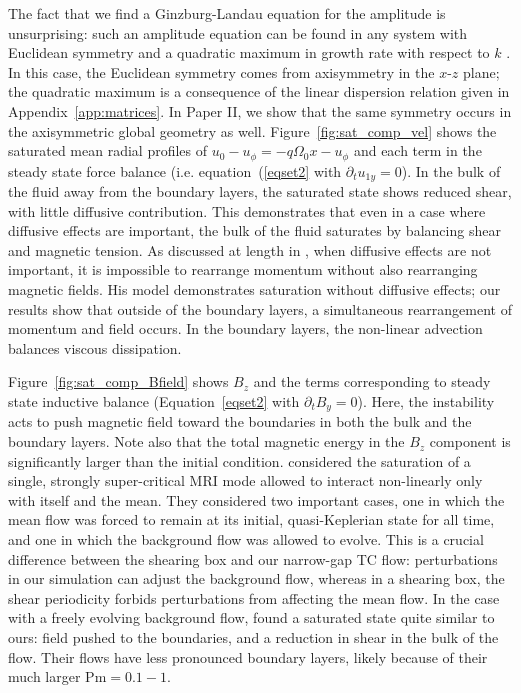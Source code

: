 \documentclass{emulateapj}
\newcommand{\Pm}{\mathrm{Pm}}
\begin{document}
The fact that we find a Ginzburg-Landau equation for the amplitude is unsurprising: such an amplitude equation can be found in any system with Euclidean symmetry and a quadratic maximum in growth rate with respect to $k$ \citep{Hoyle:2006}. In this case, the Euclidean symmetry comes from axisymmetry in the $x$-$z$ plane; the quadratic maximum is a consequence of the linear dispersion relation given in Appendix~\ref{app:matrices}.  In Paper II, we show that the same symmetry occurs in the axisymmetric global geometry as well. Figure~\ref{fig:sat_comp_vel} shows the saturated mean radial profiles of $u_0 - u_{\phi} = -q \Omega_0 x - u_{\phi}$ and each term in the steady state force balance (i.e. equation~(\ref{eqset2} with $\partial_t u_{1y} = 0$). In the bulk of the fluid away from the boundary layers, the saturated state shows reduced shear, with little diffusive contribution. This demonstrates that even in a case where diffusive effects are important, the bulk of the fluid saturates by balancing shear and magnetic tension. As discussed at length in \citet{Vasil:2015}, when diffusive effects are not important, it is impossible to rearrange momentum without also rearranging magnetic fields. His model demonstrates saturation without diffusive effects; our results show that outside of the boundary layers, a simultaneous rearrangement of momentum and field occurs. In the boundary layers, the non-linear advection balances viscous dissipation. 

Figure~\ref{fig:sat_comp_Bfield} shows $B_z$ and the terms corresponding to steady state inductive balance (Equation~\ref{eqset2} with $\partial_t B_{y} = 0$). Here, the instability acts to push magnetic field toward the boundaries in both the bulk and the boundary layers. Note also that the total magnetic energy in the $B_z$ component is significantly larger than the initial condition. \citet{Ebrahimi:2009} considered the saturation of a single, strongly super-critical MRI mode allowed to interact non-linearly only with itself and the mean. They considered two important cases, one in which the mean flow was forced to remain at its initial, quasi-Keplerian state for all time, and one in which the background flow was allowed to evolve. This is a crucial difference between the shearing box and our narrow-gap TC flow: perturbations in our simulation can adjust the background flow, whereas in a shearing box, the shear periodicity forbids perturbations from affecting the mean flow. In the case with a freely evolving background flow, \citet{Ebrahimi:2009ey} found a saturated state quite similar to ours: field pushed to the boundaries, and a reduction in shear in the bulk of the flow. Their flows have less pronounced boundary layers, likely because of their much larger $\Pm = 0.1 -1$. 
\end{document}
